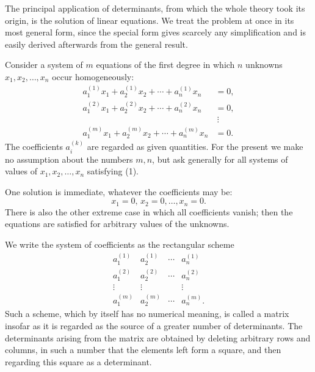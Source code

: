\documentclass[11pt]{article}
\begin{document}
The principal application of determinants, from which the whole theory took its origin, is the solution of linear equations.  We treat the problem at once in its most general form, since the special form gives scarcely any simplification and is easily derived afterwards from the general result.

Consider a system of \(m\) equations of the first degree in which \(n\) unknowns \(x_1,x_2,\ldots,x_n\) occur homogeneously:
\begin{equation}
\begin{aligned}
 a_1^{(1)}x_1+a_2^{(1)}x_2+\cdots+a_n^{(1)}x_n&=0,\\
 a_1^{(2)}x_1+a_2^{(2)}x_2+\cdots+a_n^{(2)}x_n&=0,\\
 &\ \vdots\\
 a_1^{(m)}x_1+a_2^{(m)}x_2+\cdots+a_n^{(m)}x_n&=0.
\end{aligned}
\tag{1}
\end{equation}
The coefficients \(a_i^{(k)}\) are regarded as given quantities.  For the present we make no assumption about the numbers \(m,n\), but ask generally for all systems of values of \(x_1,x_2,\ldots,x_n\) satisfying (1).

One solution is immediate, whatever the coefficients may be:
\begin{equation}
        x_1=0,\,x_2=0,\ldots,x_n=0.
\tag{2}
\end{equation}
There is also the other extreme case in which all coefficients vanish; then the equations are satisfied for arbitrary values of the unknowns.

We write the system of coefficients as the rectangular scheme
\begin{equation}
\begin{array}{cccc}
 a_1^{(1)}&a_2^{(1)}&\cdots&a_n^{(1)}\\
 a_1^{(2)}&a_2^{(2)}&\cdots&a_n^{(2)}\\
 \vdots&\vdots&&\vdots\\
 a_1^{(m)}&a_2^{(m)}&\cdots&a_n^{(m)}.
\end{array}
\tag{3}
\end{equation}
Such a scheme, which by itself has no numerical meaning, is called a matrix insofar as it is regarded as the source of a greater number of determinants.  The determinants arising from the matrix are obtained by deleting arbitrary rows and columns, in such a number that the elements left form a square, and then regarding this square as a determinant.
\end{document}
